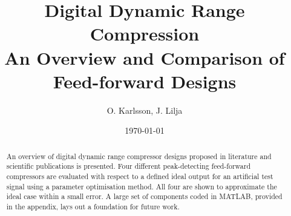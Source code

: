 \documentclass[]{article}
\begin{document}
\newcommand{\rootdir}{.}

\title{Digital Dynamic Range Compression \\ \Large An Overview and Comparison of Feed-forward Designs}
\author{O. Karlsson, J. Lilja}
\date{\today}
\maketitle

\begin{abstract}
An overview of digital dynamic range compressor designs proposed in literature and scientific publications is presented. Four different peak-detecting feed-forward compressors are evaluated with respect to a defined ideal output for an artificial test signal using a parameter optimisation method. All four are shown to approximate the ideal case within a small error. A large set of components coded in MATLAB\textsuperscript{\textregistered}, provided in the appendix, lays out a foundation for future work.
\end{abstract}
\clearpage

\tableofcontents
\clearpage


\clearpage









\clearpage


\FloatBarrier
\clearpage


\end{document}

